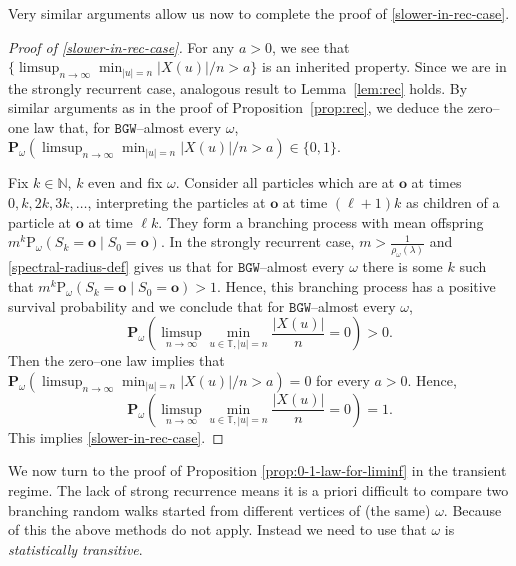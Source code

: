 \documentclass[11 pt]{article}
\theoremstyle{definition}
\numberwithin{equation}{section}
\newcommand{\NN}{\mathbb{N}}
\newcommand{\TT}{\mathbb{T}} %
\newcommand{\rt}{\mathbf{o}} %
\newcommand{\Pw}{\mathbf{P}_{\omega}} %
\newcommand{\Pws}{\mathrm{P}_{\omega}} %
\begin{document}
Very similar arguments allow us now to complete the proof of  \eqref{slower-in-rec-case}.
\begin{proof}[Proof of \eqref{slower-in-rec-case}]
	For any $a>0$, we see that $\{	\limsup_{n\to \infty} \min_{|u|=n} |X(u)|/n > a\}$ is an inherited property.  Since we are in the strongly recurrent case, analogous result to Lemma~\ref{lem:rec} holds. By similar arguments as in the proof of Proposition~\ref{prop:rec}, we deduce the zero--one law that, for $\mathtt{BGW}$--almost every $\omega$, 
	$\Pw\left(	\limsup_{n\to \infty} \min_{|u|=n} |X(u)|/n > a\right)\in \{0,1\}$. 
	
	Fix $k \in \NN$, $k$ even and fix $\omega$. Consider all particles which are at $\rt$ at times $0, k, 2k, 3k, \ldots$, interpreting the particles at $\rt$ at time $(\ell + 1)k$ as children of a particle at $\rt$ at time $\ell k$. They form a branching process with mean offspring $m^k \Pws(S_k= \rt \mid S_0= \rt)$.
	In the strongly recurrent case, $m > \frac{1}{\rho_\omega(\lambda)}$ and \eqref{spectral-radius-def} gives us that for $\mathtt{BGW}$--almost every $\omega$ there is some $k$ such that 
	$m^k \Pws(S_k= \rt \mid S_0= \rt) > 1$. Hence, this branching process has a positive survival probability and we conclude that for $\mathtt{BGW}$--almost every $\omega$,
	\begin{equation*}
		\Pw\left(	\limsup_{n\to\infty} \min_{u\in \TT, |u|=n} \frac{\vert X(u)\vert}{n} =0\right) > 0.
	\end{equation*}
Then the zero--one law implies that $\Pw\left(	\limsup_{n\to \infty} \min_{|u|=n} |X(u)|/n > a\right)=0$ for every $a>0$.  Hence,
\begin{equation}\label{slower-in-rec-case2}
\Pw\left(	\limsup_{n\to\infty} \min_{u\in \TT, |u|=n} \frac{\vert X(u)\vert}{n} =0\right) =1.
\end{equation}
This implies \eqref{slower-in-rec-case}. 
\end{proof}


We now turn to the proof of Proposition \ref{prop:0-1-law-for-liminf} in the transient regime. The lack of strong recurrence means it is a priori difficult to compare two branching random walks started from different vertices of (the same) $\omega$. Because of this the above methods do not apply. Instead we need to use that $\omega$ is \emph{statistically transitive}. 
\end{document}
